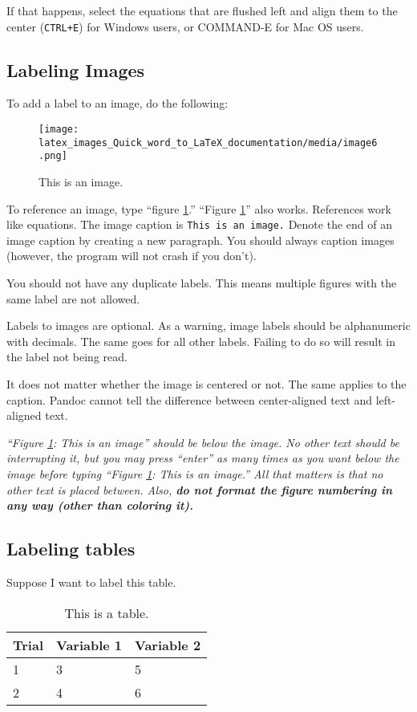 \documentclass[12pt]{article}
\theoremstyle{plain}
\theoremstyle{remark}
\theoremstyle{definition}
\begin{document}
If that happens, select the equations that are flushed left and align
them to the center (\texttt{CTRL+E}) for Windows users, or COMMAND-E for
Mac OS users.


\subsection{Labeling Images}

To add a label to an image, do the following:


\begin{figure}[H]
\centering
\texttt{[image: latex\_images\_Quick\_word\_to\_LaTeX\_documentation/media/image6.png]}
\caption{This is an image.}
\label{fig:p1}
\end{figure}



To reference an image, type ``figure \ref{fig:p1}.'' ``Figure \ref{fig:p1}'' also works.
References work like equations. The image caption is
\texttt{This\ is\ an\ image.} Denote the end of an image caption by
creating a new paragraph. You should always caption images (however, the
program will not crash if you don't).

You should not have any duplicate labels. This means multiple figures
with the same label are not allowed.

Labels to images are optional. As a warning, image labels should be
alphanumeric with decimals. The same goes for all other labels. Failing
to do so will result in the label not being read.

It does not matter whether the image is centered or not. The same
applies to the caption. Pandoc cannot tell the difference between
center-aligned text and left-aligned text.

\emph{``Figure \ref{fig:p1}: This is an image'' should be below the image. No other
text should be interrupting it, but you may press ``enter'' as many
times as you want below the image before typing ``Figure \ref{fig:p1}: This is an
image.'' All that matters is that no other text is placed between. Also,
\textbf{do not format the figure numbering in any way (other than
coloring it).}}


\subsection{Labeling tables}

Suppose I want to label this table.

\begin{table}[H]
\centering

\label{table:p1}

\begin{tabular}{|m{11em}|m{11em}|m{11em}|}

\hline
Trial& Variable 1& Variable 2\\ \hline
1 & 3 & 5 \\ \hline
2 & 4 & 6
\\\hline
\end{tabular}
\caption{This is a table.}

\end{table}
\end{document}
